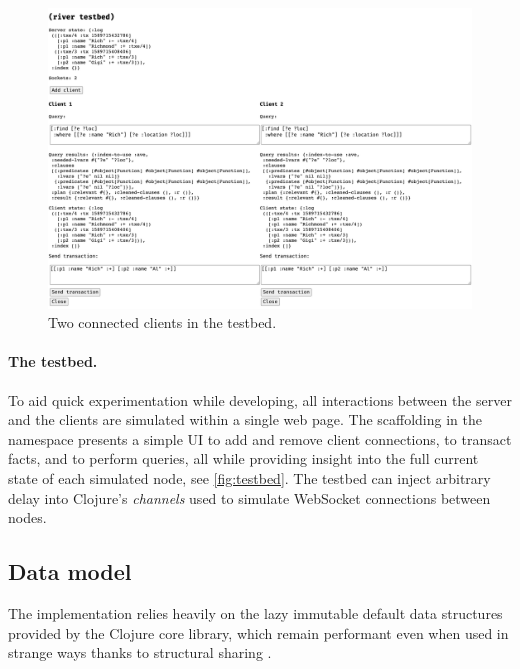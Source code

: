 \cleardoublepage
\begin{figure}[!ht]
  \includegraphics[width=0.9\linewidth]{images/testbed.png}
  \caption{Two connected clients in the testbed.}
  \label{fig:testbed}
\end{figure}

\paragraph{The testbed.} To aid quick experimentation while developing, all interactions between the server and the clients are simulated within a single web page. The scaffolding in the  namespace presents a simple UI to add and remove client connections, to transact facts, and to perform queries, all while providing insight into the full current state of each simulated node, see \autoref{fig:testbed}. The testbed can inject arbitrary delay into Clojure's  \emph{channels} used to simulate WebSocket connections between nodes.

\subsection{Data model}\label{sec:impl_datamodel}
The implementation relies heavily on the lazy immutable default data structures \cite{hickey2009persistent} provided by the Clojure core library, which remain performant even when used in strange ways thanks to structural sharing \cite{okasaki1999purely}.

